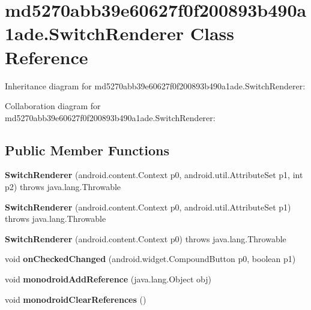\hypertarget{classmd5270abb39e60627f0f200893b490a1ade_1_1_switch_renderer}{}\section{md5270abb39e60627f0f200893b490a1ade.\+Switch\+Renderer Class Reference}
\label{classmd5270abb39e60627f0f200893b490a1ade_1_1_switch_renderer}


Inheritance diagram for md5270abb39e60627f0f200893b490a1ade.\+Switch\+Renderer\+:


Collaboration diagram for md5270abb39e60627f0f200893b490a1ade.\+Switch\+Renderer\+:
\subsection*{Public Member Functions}
\begin{DoxyCompactItemize}
\item 
\mbox{\label{classmd5270abb39e60627f0f200893b490a1ade_1_1_switch_renderer_a28d4f09146c66b0991594aa4e5b0f7ff}} 
{\bfseries Switch\+Renderer} (android.\+content.\+Context p0, android.\+util.\+Attribute\+Set p1, int p2)  throws java.\+lang.\+Throwable 	
\item 
\mbox{\label{classmd5270abb39e60627f0f200893b490a1ade_1_1_switch_renderer_a2dc3f9d51a00b56ed319cbf9b5dab267}} 
{\bfseries Switch\+Renderer} (android.\+content.\+Context p0, android.\+util.\+Attribute\+Set p1)  throws java.\+lang.\+Throwable 	
\item 
\mbox{\label{classmd5270abb39e60627f0f200893b490a1ade_1_1_switch_renderer_aea0207fcf836b5f128c00a9bfabce2cb}} 
{\bfseries Switch\+Renderer} (android.\+content.\+Context p0)  throws java.\+lang.\+Throwable 	
\item 
\mbox{\label{classmd5270abb39e60627f0f200893b490a1ade_1_1_switch_renderer_aef153bafa3b4b8c95620b6c59d403578}} 
void {\bfseries on\+Checked\+Changed} (android.\+widget.\+Compound\+Button p0, boolean p1)
\item 
\mbox{\label{classmd5270abb39e60627f0f200893b490a1ade_1_1_switch_renderer_a363c621199304e433d9aec4e62dfb8fa}} 
void {\bfseries monodroid\+Add\+Reference} (java.\+lang.\+Object obj)
\item 
\mbox{\label{classmd5270abb39e60627f0f200893b490a1ade_1_1_switch_renderer_a269d9c853effc1c0864414f6ee8130f3}} 
void {\bfseries monodroid\+Clear\+References} ()
\end{DoxyCompactItemize}
